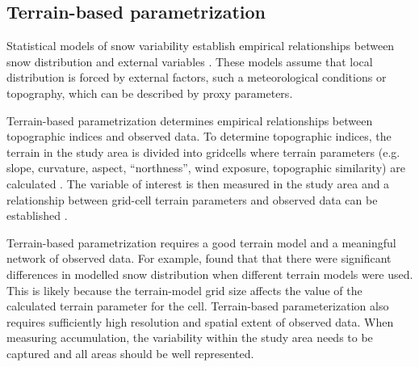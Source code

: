 \documentclass{sfuthesis}
\begin{document}
\subsection{Terrain-based parametrization}
Statistical models of snow variability establish empirical relationships between snow distribution and external variables \citep{Fowler2007}. These models assume that local distribution is forced by external factors, such a meteorological conditions or topography, which can be described by proxy parameters.

Terrain-based parametrization determines empirical relationships between topographic indices and observed data. To determine topographic indices, the terrain in the study area is divided into gridcells where terrain parameters (e.g. slope, curvature, aspect, ``northness'', wind exposure, topographic similarity) are calculated \citep{Anderson2014,McGrath2015}. The variable of interest is then measured in the study area and a relationship between grid-cell terrain parameters and observed data can be established \citep[e.g.][]{Bloschl1991, Liston1998, Anderton2004,McGrath2015}. 

Terrain-based parametrization requires a good terrain model and a meaningful network of observed data. For example, \cite{Molotch2005} found that that there were significant differences in modelled snow distribution when different terrain models were used. This is likely because the terrain-model grid size affects the value of the calculated terrain parameter for the cell. Terrain-based parameterization also requires sufficiently high resolution and spatial extent of observed data. When measuring accumulation, the variability within the study area needs to be captured and all areas should be well represented. 
\end{document}
